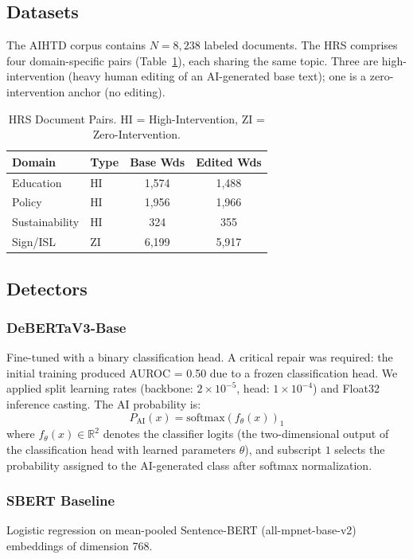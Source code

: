 \documentclass[conference]{IEEEtran}
\begin{document}
\subsection{Datasets}

The AIHTD corpus contains $N = 8{,}238$ labeled documents. The HRS comprises four domain-specific pairs (Table~\ref{tab:pairs}), each sharing the same topic. Three are high-intervention (heavy human editing of an AI-generated base text); one is a zero-intervention anchor (no editing).

\begin{table}[t]
\centering
\caption{HRS Document Pairs. HI = High-Intervention, ZI = Zero-Intervention.}
\label{tab:pairs}
\small
\begin{tabular}{llcc}
\toprule
\textbf{Domain} & \textbf{Type} & \textbf{Base Wds} & \textbf{Edited Wds} \\
\midrule
Education      & HI   & 1,574 & 1,488 \\
Policy         & HI   & 1,956 & 1,966 \\
Sustainability & HI   & 324   & 355   \\
Sign/ISL       & ZI   & 6,199 & 5,917 \\
\bottomrule
\end{tabular}
\end{table}

\subsection{Detectors}

\subsubsection{DeBERTaV3-Base} Fine-tuned with a binary classification head. A critical repair was required: the initial training produced AUROC = 0.50 due to a frozen classification head. We applied split learning rates (backbone: $2 \times 10^{-5}$, head: $1 \times 10^{-4}$) and Float32 inference casting. The AI probability is:
\begin{equation}
    P_{\text{AI}}(x) = \text{softmax}(f_\theta(x))_1
\end{equation}
where $f_\theta(x) \in \mathbb{R}^2$ denotes the classifier logits (the two-dimensional output of the classification head with learned parameters $\theta$), and subscript $1$ selects the probability assigned to the AI-generated class after softmax normalization.

\subsubsection{SBERT Baseline} Logistic regression on mean-pooled Sentence-BERT (all-mpnet-base-v2) embeddings of dimension 768.
\end{document}
